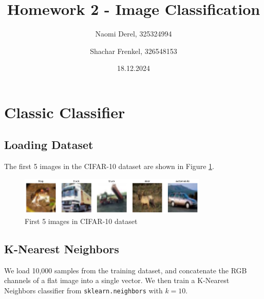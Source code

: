 \documentclass{article}
\title{Homework 2 - Image Classification}
\author{Naomi Derel, 325324994 
\and Shachar Frenkel, 326548153}
\date{18.12.2024}
\begin{document}
\maketitle

\section{Classic Classifier}

\subsection{Loading Dataset}
The first 5 images in the CIFAR-10 dataset are shown in Figure \ref{fig:cifar10_images}.
\begin{figure}[h!]
    \centering
    \includegraphics[width=0.8\textwidth]{figs/1.1_ex.png}
    \caption{First 5 images in CIFAR-10 dataset}
    \label{fig:cifar10_images}
\end{figure}

\subsection{K-Nearest Neighbors}
We load 10,000 samples from the training dataset, and concatenate the RGB channels of a flat image into a single vector. We then train a K-Nearest Neighbors classifier from \texttt{sklearn.neighbors} with $k=10$.
\end{document}
